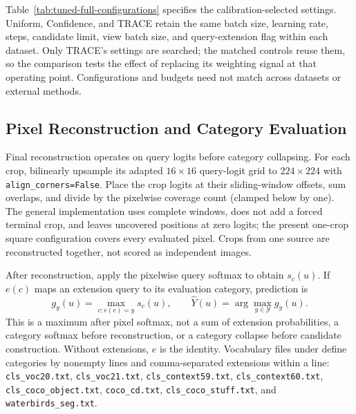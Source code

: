 

Table~\ref{tab:tuned-full-configurations} specifies the calibration-selected settings. Uniform, Confidence, and TRACE retain the same batch size, learning rate, steps, candidate limit, view batch size, and query-extension flag within each dataset. Only TRACE's settings are searched; the matched controls reuse them, so the comparison tests the effect of replacing its weighting signal at that operating point. Configurations and budgets need not match across datasets or external methods.

\subsection{Pixel Reconstruction and Category Evaluation}
Final reconstruction operates on query logits before category collapsing. For each crop, bilinearly upsample its adapted $16\times16$ query-logit grid to $224\times224$ with \texttt{align\_corners=False}. Place the crop logits at their sliding-window offsets, sum overlaps, and divide by the pixelwise coverage count (clamped below by one). The general implementation uses complete windows, does not add a forced terminal crop, and leaves uncovered positions at zero logits; the present one-crop square configuration covers every evaluated pixel. Crops from one source are reconstructed together, not scored as independent images.

After reconstruction, apply the pixelwise query softmax to obtain $s_c(u)$. If $e(c)$ maps an extension query to its evaluation category, prediction is
\begin{equation}
g_y(u)=\max_{c:e(c)=y}s_c(u),\qquad
\widehat Y(u)=\arg\max_{y\in\mathcal Y}g_y(u).
\end{equation}
This is a maximum after pixel softmax, not a sum of extension probabilities, a category softmax before reconstruction, or a category collapse before candidate construction. Without extensions, $e$ is the identity. Vocabulary files under  define categories by nonempty lines and comma-separated extensions within a line: \texttt{cls\_voc20.txt}, \texttt{cls\_voc21.txt}, \texttt{cls\_context59.txt}, \texttt{cls\_context60.txt}, \texttt{cls\_coco\_object.txt}, \texttt{coco\_cd.txt}, \texttt{cls\_coco\_stuff.txt}, and \texttt{waterbirds\_seg.txt}.

